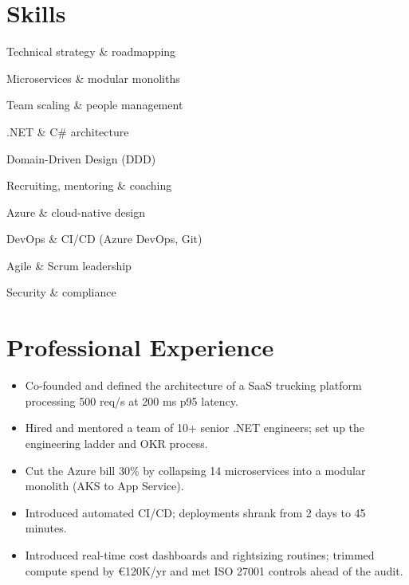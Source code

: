 \documentclass{milanovic-resume}
\begin{document}
\makeheader


\section{Skills}
\begin{skills}
  \item Technical strategy \& roadmapping
  \item Microservices \& modular monoliths
  \item Team scaling \& people management
  \item .NET \& C\# architecture
  \item Domain-Driven Design (DDD)
  \item Recruiting, mentoring \& coaching
  \item Azure \& cloud-native design
  \item DevOps \& CI/CD (Azure DevOps, Git)
  \item Agile \& Scrum leadership
  \item Security \& compliance
\end{skills}

\section{Professional Experience}

\begin{itemize}
  \item Co-founded and defined the architecture of a SaaS trucking platform processing 500 req/s at 200 ms p95 latency.
  \item Hired and mentored a team of 10+ senior .NET engineers; set up the engineering ladder and OKR process.
  \item Cut the Azure bill 30\% by collapsing 14 microservices into a modular monolith (AKS to App Service).
  \item Introduced automated CI/CD; deployments shrank from 2 days to 45 minutes.
  \item Introduced real-time cost dashboards and rightsizing routines; trimmed compute spend by €120K/yr
        and met ISO 27001 controls ahead of the audit.
\end{itemize}
\end{document}
